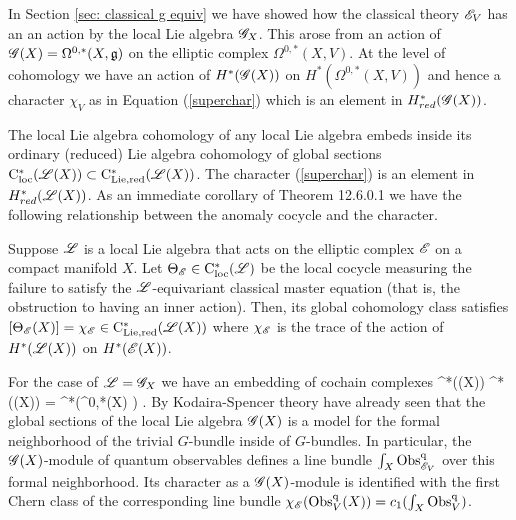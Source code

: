 \documentclass[10pt]{amsart}
\def\brian{\textcolor{blue}{BW: }\textcolor{blue}}
\begin{document}

In Section \ref{sec: classical g equiv} we have showed how the classical theory $\mathscr E_{V}$ has an an action by the local Lie algebra $\mathscr G_X$.
This arose from an action of $\mathscr G(X) = \Omega^{0,*}(X, \mathfrak g)$ on the elliptic complex $\Omega^{0,*}(X, V)$. 
At the level of cohomology we have an action of $H^*(\mathscr G(X))$ on $H^*(\Omega^{0,*}(X, V))$ and hence a character $\chi_{V}$ as in Equation (\ref{superchar}) which is an element in $H^*_{red}(\mathscr G(X))$. 

The local Lie algebra cohomology of any local Lie algebra embeds inside its ordinary (reduced) Lie algebra cohomology of global sections ${\rm C}_{\rm loc}^*(\mathscr L(X)) \subset {\rm C}_{\rm Lie, red}^*(\mathscr L(X))$. 
The character (\ref{superchar}) is an element in $H_{red}^*(\mathscr L(X))$.
As an immediate corollary of \cite{CG2} Theorem 12.6.0.1 we have the following relationship between the anomaly cocycle and the character.

\begin{prop}\label{inner char}
Suppose $\mathscr L$ is a local Lie algebra that acts on the elliptic complex $\mathscr E$ on a compact manifold $X$.
Let $\Theta_\mathscr E \in {\rm C}_{\rm loc}^*(\mathscr L)$ be the local cocycle measuring the failure to satisfy the $\mathscr L$-equivariant classical master equation (that is, the obstruction to having an inner action).
Then, its global cohomology class satisfies $[\Theta_\mathscr E (X)] = \chi_{\mathscr E} \in {\rm C}_{\rm Lie, red}^*(\mathscr L(X))$ where $\chi_\mathscr E$ is the trace of the action of $H^*(\mathscr L(X))$ on $H^*(\mathscr E(X))$. 
\end{prop}


For the case of $\mathscr L = \mathscr G_X$ we have an embedding of cochain complexes
\ben
\cloc^*(\sG(X)) \hookrightarrow \cred^*(\sG(X)) = \cred^*(\Omega^{0,*}(X) \tensor \fg) .
\een
By Kodaira-Spencer theory have already seen that the global sections of the local Lie algebra $\mathscr G(X)$ is a model for the formal neighborhood of the trivial $G$-bundle inside of $G$-bundles. 
In particular, the $\mathscr G(X)$-module of quantum observables defines a line bundle $\int_X {\rm Obs}^{\rm q}_{\mathscr E_V}$ over this formal neighborhood.
Its character as a $\mathscr G(X)$-module is identified with the first Chern class of the corresponding line bundle $\chi_\mathscr E({\rm Obs}^{\rm q}_{V}(X)) = c_1(\int_X {\rm Obs}^{\rm q}_{V})$. 
\end{document}
